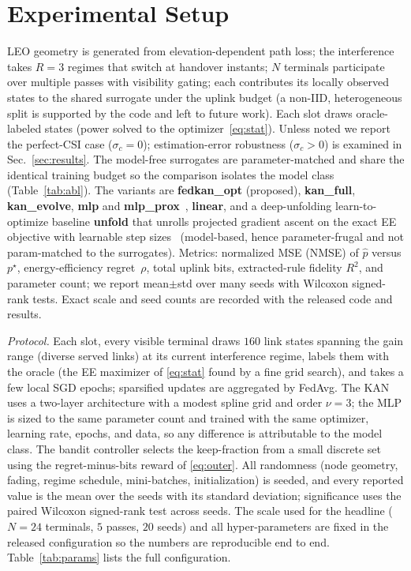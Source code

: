 \documentclass[journal]{IEEEtran}
\newcommand{\pstar}{p^{\star}}
\newcommand{\Nnodes}{24}\newcommand{\Nseeds}{20}
\newcommand{\Npasses}{5}\newcommand{\Nsamp}{160}
\begin{document}
\section{Experimental Setup}\label{sec:setup}
LEO geometry is generated from elevation-dependent path loss; the interference
takes $R=3$ regimes that switch at handover instants; $N$ terminals participate
over multiple passes with visibility gating; each contributes its locally observed
states to the shared surrogate under the uplink budget (a non-IID, heterogeneous
split is supported by the code and left to future work). Each slot draws
oracle-labeled states (power solved to the optimizer~\eqref{eq:stat}).
Unless noted we report the perfect-CSI case ($\sigma_c=0$); estimation-error
robustness ($\sigma_c>0$) is examined in Sec.~\ref{sec:results}. The model-free
surrogates are parameter-matched and share the identical training budget so the
comparison isolates the model class (Table~\ref{tab:abl}). The variants are
\textbf{fedkan\_opt} (proposed), \textbf{kan\_full}, \textbf{kan\_evolve},
\textbf{mlp} and \textbf{mlp\_prox}~\cite{li2020fedprox}, \textbf{linear}, and a
deep-unfolding learn-to-optimize baseline \textbf{unfold} that unrolls projected
gradient ascent on the exact EE objective with learnable step
sizes~\cite{balatsoukas2019unfolding} (model-based, hence parameter-frugal and not
param-matched to the surrogates). Metrics: normalized
MSE (NMSE) of $\hat p$ versus $\pstar$, energy-efficiency regret~$\rho$, total
uplink bits, extracted-rule fidelity $R^2$, and parameter count; we report
mean$\pm$std over many seeds with Wilcoxon signed-rank tests. Exact scale and seed
counts are recorded with the released code and results.

\emph{Protocol.} Each slot, every visible terminal draws $\Nsamp$ link states
spanning the gain range (diverse served links) at its current interference regime,
labels them with the oracle (the EE maximizer of \eqref{eq:stat} found by a fine
grid search), and takes a few local SGD epochs; sparsified updates are aggregated
by FedAvg. The KAN uses a two-layer architecture with a modest spline grid and
order $\nu=3$; the MLP is sized to the same parameter count and trained with the
same optimizer, learning rate, epochs, and data, so any difference is attributable
to the model class. The bandit controller selects the keep-fraction from a small
discrete set using the regret-minus-bits reward of \eqref{eq:outer}. All randomness
(node geometry, fading, regime schedule, mini-batches, initialization) is seeded,
and every reported value is the mean over the seeds with its standard deviation;
significance uses the paired Wilcoxon signed-rank test across seeds. The scale used
for the headline ($N=\Nnodes$ terminals, $\Npasses$ passes, $\Nseeds$ seeds) and
all hyper-parameters are fixed in the released configuration so the numbers are
reproducible end to end. Table~\ref{tab:params} lists the full configuration.
\end{document}
